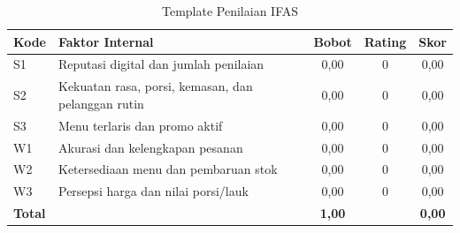 \begin{table}[!htbp]
    \centering
    \caption{Template Penilaian IFAS}
    \label{tab:template-penilaian-ifas}
    \footnotesize
    \setlength{\tabcolsep}{4pt}
    \renewcommand{\arraystretch}{0.95}
    \begin{tabularx}{\textwidth}{|Z{1.2cm}|Y|c|c|c|}
        \toprule
        \textbf{Kode} & \textbf{Faktor Internal} & \textbf{Bobot} & \textbf{Rating} & \textbf{Skor} \\ \hline
        \midrule
        S1 & Reputasi digital dan jumlah penilaian & 0,00 & 0 & 0,00 \\ \hline
        S2 & Kekuatan rasa, porsi, kemasan, dan pelanggan rutin & 0,00 & 0 & 0,00 \\ \hline
        S3 & Menu terlaris dan promo aktif & 0,00 & 0 & 0,00 \\ \hline
        W1 & Akurasi dan kelengkapan pesanan & 0,00 & 0 & 0,00 \\ \hline
        W2 & Ketersediaan menu dan pembaruan stok & 0,00 & 0 & 0,00 \\ \hline
        W3 & Persepsi harga dan nilai porsi/lauk & 0,00 & 0 & 0,00 \\ \hline
        \textbf{Total} &  & \textbf{1,00} &  & \textbf{0,00} \\ \hline
        \bottomrule
    \end{tabularx}
\end{table}

